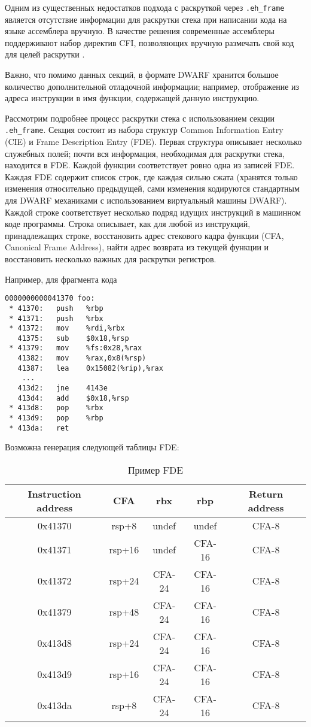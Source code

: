 Одним из существенных недостатков подхода с раскруткой через \verb!.eh_frame! является отсутствие информации для раскрутки стека
при написании кода на языке ассемблера вручную. В качестве решения современные ассемблеры поддерживают набор директив CFI, позволяющих
вручную размечать свой код для целей раскрутки \cite{cfi:directives}.

Важно, что помимо данных секций, в формате DWARF хранится большое количество дополнительной отладочной информации;
например, отображение из адреса инструкции в имя функции, содержащей данную инструкцию.

Рассмотрим подробнее процесс раскрутки стека с использованием секции \verb!.eh_frame!.
Секция состоит из набора структур Common Information Entry (CIE) и Frame Description Entry (FDE).
Первая структура описывает несколько служебных полей; почти вся информация, необходимая для раскрутки стека, находится в FDE.
Каждой функции соответствует ровно одна из записей FDE.
Каждая FDE содержит список строк, где каждая сильно сжата (хранятся только изменения относительно предыдущей, сами изменения кодируются
стандартным для DWARF механиками с использованием виртуальный машины DWARF).
Каждой строке соответствует несколько подряд идущих инструкций в машинном коде программы. Строка описывает, как для любой из инструкций,
принадлежащих строке, восстановить адрес стекового кадра функции (CFA, Canonical Frame Address),
найти адрес возврата из текущей функции и восстановить несколько важных для раскрутки регистров.

Например, для фрагмента кода
\begin{verbatim}
0000000000041370 foo:
 * 41370:	push   %rbp
 * 41371:	push   %rbx
 * 41372:	mov    %rdi,%rbx
   41375:	sub    $0x18,%rsp
 * 41379:	mov    %fs:0x28,%rax
   41382:	mov    %rax,0x8(%rsp)
   41387:	lea    0x15082(%rip),%rax
    ...
   413d2:	jne    4143e
   413d4:	add    $0x18,%rsp
 * 413d8:	pop    %rbx
 * 413d9:	pop    %rbp
 * 413da:	ret
\end{verbatim}

Возможна генерация следующей таблицы FDE:
\begin{table}[H]
\begin{center}
\begin{tabular}{ |c||c|c|c|c| } 
 \hline
Instruction address   & CFA    & rbx    & rbp    & Return address \\
 \hline
0x41370 & rsp+8  & undef  & undef  & CFA-8 \\
0x41371 & rsp+16 & undef  & CFA-16 & CFA-8 \\
0x41372 & rsp+24 & CFA-24 & CFA-16 & CFA-8 \\
0x41379 & rsp+48 & CFA-24 & CFA-16 & CFA-8 \\
0x413d8 & rsp+24 & CFA-24 & CFA-16 & CFA-8 \\
0x413d9 & rsp+16 & CFA-24 & CFA-16 & CFA-8 \\
0x413da & rsp+8  & CFA-24 & CFA-16 & CFA-8 \\
 \hline
\end{tabular}
\end{center}
\caption{Пример FDE}
\end{table}

